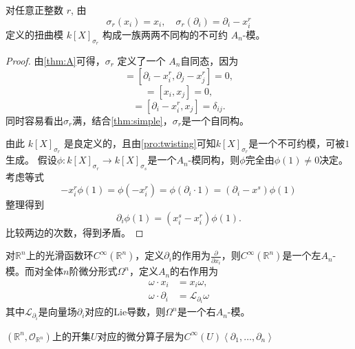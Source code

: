 \documentclass[12pt,a4paper]{ctexrep}   %
\begin{document}
\begin{theorem}
    对任意正整数 $r$,
    由
    \[
        \sigma_r(x_i)=x_i,\quad \sigma_r(\partial_i)=\partial_i-x_i^r
    \]
    定义的扭曲模 $k[X]_{\sigma_r}$
    构成一族两两不同构的不可约 $A_n$-模。
    \begin{proof}
        由\ref{thm:A}可得，$\sigma_r$ 定义了一个 $A_n$自同态，因为
        \begin{equation*}
            [\sigma_r(\partial_i),\sigma_r(\partial_j)]
            =[\partial_i-x_i^r,\partial_j-x_j^r]
            =0,
        \end{equation*}
        \begin{equation*}
            [\sigma_r(x_i),\sigma_r(x_j)]
            =[x_i,x_j]
            =0,
        \end{equation*}
        \begin{equation*}
            [\sigma_r(\partial_i),\sigma_r(x_j)]
            =[\partial_i-x_i^r,x_j]
            =\delta_{ij}.
        \end{equation*}
        同时容易看出$\sigma_r$满，结合\ref{thm:simple}，$\sigma_r$是一个自同构。

        由此 $k[X]_{\sigma_r}$ 是良定义的，且由\ref{pro:twisting}可知$k[X]_{\sigma_r}$是一个不可约模，可被$1$生成。
        假设$\phi:k[X]_{\sigma_r}\to k[X]_{\sigma_s}$是一个$A_n$-模同构，则$\phi$完全由$\phi(1)\neq 0$决定。考虑等式
        \begin{equation*}
            -x_i^r\phi(1)
            =
            \phi(-x_i^r)
            =
            \phi(\partial_i\cdot 1)
            =
            (\partial_i-x^s)\phi(1)
        \end{equation*}
        整理得到
        \begin{equation*}
            \partial_i\phi(1)=(x_i^s-x_i^r)\phi(1).
        \end{equation*}
        比较两边的次数，得到矛盾。
    \end{proof}

\end{theorem}


\begin{example}
    对$\mathbb{R}^n$上的光滑函数环$C^\infty(\mathbb{R}^n)$，定义$\partial_i$的作用为$\frac{\partial}{\partial x_i}$，则$C^\infty(\mathbb{R}^n)$是一个左$A_n$-模。而对全体$n$阶微分形式$\Omega^n$，定义$A_n$的右作用为
    \begin{equation*}
        \begin{aligned}
            \omega \cdot x_i        & =  x_i \omega,                    \\
            \omega \cdot \partial_i & =  \mathcal{L}_{\partial_i}\omega
        \end{aligned}
    \end{equation*}
    其中$\mathcal{L}_{\partial_i}$是向量场$\partial_i$对应的Lie导数，则$\Omega^n$是一个右$A_n$-模。
\end{example}
\begin{remark}
    $\left(\mathbb{R}^n,\mathcal{O}_{\mathbb{R}^n}\right)$上的开集$U$对应的微分算子层为$C^\infty(U)\left\langle \partial_1,\ldots,\partial_n \right\rangle$
\end{remark}
\end{document}
